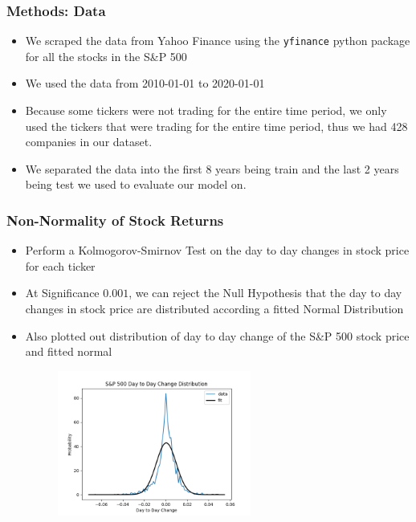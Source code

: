 \documentclass{beamer}
\begin{document}
\begin{frame}
    \frametitle{Methods: Data}
    \begin{itemize}
        \item We scraped the data from Yahoo Finance using the \texttt{yfinance} python package for all the stocks in the S\&P 500 
        \item We used the data from 2010-01-01 to 2020-01-01
        \item Because some tickers were not trading for the entire time period, we only used the tickers that were trading for the entire time period, thus we had 428 companies in our dataset.
        \item We separated the data into the first 8 years being train and the last 2 years being test we used to evaluate our model on.
    \end{itemize}
\end{frame}
\begin{frame}
    \frametitle{Non-Normality of Stock Returns}
    \begin{itemize}
    \item Perform a Kolmogorov-Smirnov Test on the day to day changes in stock price for each ticker
    \item At Significance $0.001$, we can reject the Null Hypothesis that the day to day changes in stock price are distributed 
        according a fitted Normal Distribution
    \item Also plotted out distribution of day to day change of the S\&P 500 stock price and fitted normal
    \begin{figure}[H]
        \centering
        \includegraphics[width=0.6\textwidth]{../day_to_day_change.png}
    \end{figure}
\end{itemize}
\end{frame}
\end{document}
